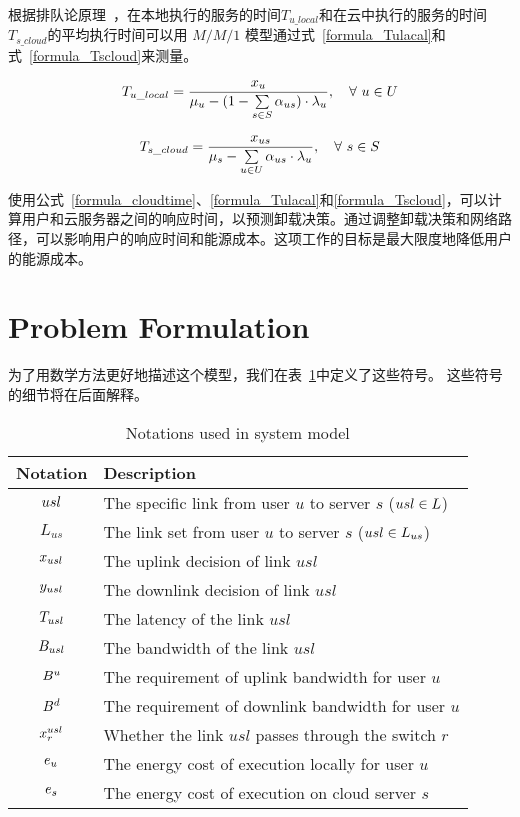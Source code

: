 根据排队论原理~\cite{Queueing:systems}，在本地执行的服务的时间$T_{u\_local}$和在云中执行的服务的时间$T_{s\_cloud}$的平均执行时间可以用 $M/M/1$ 模型通过式~\eqref{formula_Tulacal}和式~\eqref{formula_Tscloud}来测量。

\vspace{-0.5em}
\begin{equation}
\label{formula_Tulacal}
{T}_{u\_local} = \frac{{x}_{u}}{{\mu}_{u} - (1 - \sum\limits_{s \in S} {\alpha}_{us}) \cdot {\lambda}_{u}}, \quad \forall \ u \in U
\end{equation}


\begin{equation}
\label{formula_Tscloud}
{T}_{s\_cloud} = \frac{{x}_{us}}{{\mu}_{s} - \sum\limits_{u \in U} {\alpha}_{us} \cdot {\lambda}_{u}}, \quad \forall \ s \in S
\end{equation}

使用公式~\eqref{formula_cloudtime}、\eqref{formula_Tulacal}和\eqref{formula_Tscloud}，可以计算用户和云服务器之间的响应时间，以预测卸载决策。通过调整卸载决策和网络路径，可以影响用户的响应时间和能源成本。这项工作的目标是最大限度地降低用户的能源成本。

\section{Problem Formulation}

为了用数学方法更好地描述这个模型，我们在表~\ref{table_notations_ispa}中定义了这些符号。 这些符号的细节将在后面解释。

\begin{table}[!h]
  \caption{Notations used in system model}
  \vspace{-1em}
  \label{table_notations_ispa}
  \centering
  \begin{tabular}{c|p{6cm}}
  \hline
  \textbf{Notation} & \textbf{Description}\\
  \hline
  $usl$ & The specific link from user $u$ to server $s$ ($usl \in L$)\\\hline
  $L_{us}$ & The link set from user $u$ to server $s$ ($usl \in L_{us}$)\\\hline
  $x_{usl}$ & The uplink decision of link $usl$\\\hline
  $y_{usl}$ & The downlink decision of link $usl$\\\hline
  $T_{usl}$ & The latency of the link $usl$\\\hline
  $B_{usl}$ & The bandwidth of the link $usl$\\\hline
  $B^{u}$ & The requirement of uplink bandwidth for user $u$\\\hline
  $B^{d}$ & The requirement of downlink bandwidth for user $u$\\\hline
  $x^{usl}_{r}$ & Whether the link $usl$ passes through the switch $r$\\\hline
  $e_u$ & The energy cost of execution locally for user $u$\\\hline
  $e_s$ & The energy cost of execution on cloud server $s$\\\hline
  \end{tabular}
\end{table}

